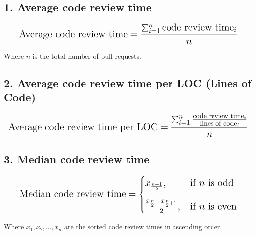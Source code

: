 \begin{appendices}
\subsection*{1. Average code review time}

\begin{equation}
\mathlarger{\mathlarger{\text{Average code review time} = \frac{\sum_{i=1}^{n} \text{code review time}_i}{n}}}
\end{equation}

Where $n$ is the total number of pull requests.

\subsection*{2. Average code review time per LOC (Lines of Code)}

\begin{equation}
\mathlarger{\mathlarger{\text{Average code review time per LOC} = \frac{\sum_{i=1}^{n} \frac{\text{code review time}_i}{\text{lines of code}_i}}{n}}}
\end{equation}

\subsection*{3. Median code review time}

\begin{equation}
\mathlarger{\mathlarger{
\text{Median code review time} = 
\begin{cases}
    x_{\frac{n+1}{2}}, & \text{if $n$ is odd} \\[2ex]
    \frac{x_{\frac{n}{2}} + x_{\frac{n}{2}+1}}{2}, & \text{if $n$ is even}
\end{cases}
}}
\end{equation}

Where $x_1, x_2, ..., x_n$ are the sorted code review times in ascending order.
\end{appendices}